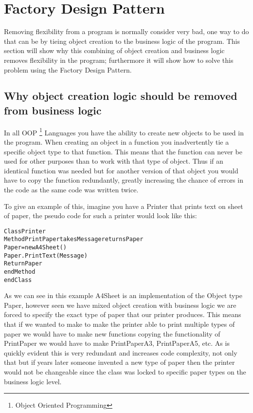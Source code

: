 
\section{Factory Design Pattern}

Removing flexibility from a program is normally consider very bad,
one way to do that can be by tieing object creation to the business
logic of the program. This section will show why this combining of
object creation and business logic removes flexibility in the program;
furthermore it will show how to solve this problem using the Factory
Design Pattern.


\subsection*{Why object creation logic should be removed from business logic}

In all OOP%
\footnote{Object Oriented Programming%
} Languages you have the ability to create new objects to be used in
the program. When creating an object in a function you inadvertently
tie a specific object type to that function. This means that the function
can never be used for other purposes than to work with that type of
object. Thus if an identical function was needed but for another version
of that object you would have to copy the function redundantly, greatly
increasing the chance of errors in the code as the same code was written
twice.

To give an example of this, imagine you have a Printer that prints
text on sheet of paper, the pseudo code for such a printer would look
like this:

\begin{alltt}
Class Printer 
    Method PrintPaper takes Message returns Paper
        Paper = new A4Sheet() 		
        Paper.PrintText(Message) 		
        Return Paper 	
    endMethod 
endClass
\end{alltt}

As we can see in this example A4Sheet is an implementation of the
Object type Paper, however seen we have mixed object creation with
business logic we are forced to specify the exact type of paper that
our printer produces. This means that if we wanted to make to make
the printer able to print multiple types of paper we would have to
make new functions copying the functionality of PrintPaper we would
have to make PrintPaperA3, PrintPaperA5, etc. As is quickly evident
this is very redundant and increases code complexity, not only that
but if years later someone invented a new type of paper then the printer
would not be changeable since the class was locked to specific paper
types on the business logic level. 


